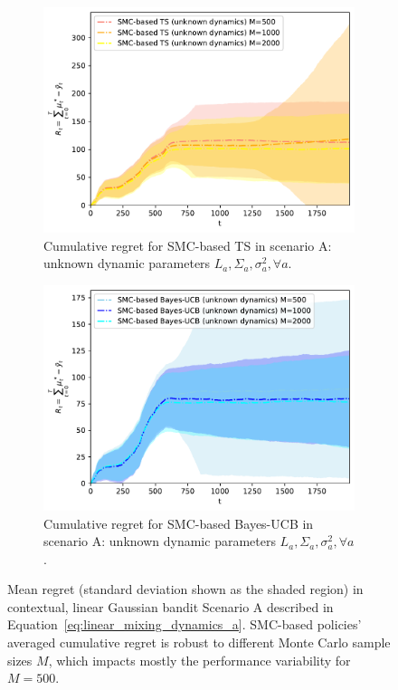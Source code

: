 \begin{figure}[!h]
		\begin{subfigure}[b]{0.45\textwidth}
		\includegraphics[width=\textwidth]{./fods_figs/dynamic/linearGaussian/a_selectedM_cumulative_regret_dunknown_ts}
		\caption{Cumulative regret for SMC-based TS in scenario A: unknown dynamic parameters $L_a,\Sigma_a,\sigma_a^2, \forall a$.}
		\label{fig:dynamic_bandits_linearGaussian_a_ts_dunknown_M}
	\end{subfigure}\qquad
	\begin{subfigure}[b]{0.45\textwidth}
		\includegraphics[width=\textwidth]{./fods_figs/dynamic/linearGaussian/a_selectedM_cumulative_regret_dunknown_bucb}
		\caption{Cumulative regret for SMC-based Bayes-UCB in scenario A: unknown dynamic parameters $L_a,\Sigma_a,\sigma_a^2, \forall a$.}
		\label{fig:dynamic_bandits_linearGaussian_a_bucb_dunknown_M}
	\end{subfigure}

	\caption{
		Mean regret (standard deviation shown as the shaded region) in contextual, linear Gaussian bandit Scenario A
		described in Equation~\eqref{eq:linear_mixing_dynamics_a}.
		SMC-based policies' averaged cumulative regret is robust to different Monte Carlo sample sizes $M$,
		which impacts mostly the performance variability for $M=500$. 
	}
	\label{fig:dynamic_bandits_linearGaussian_a_M}
\end{figure}

